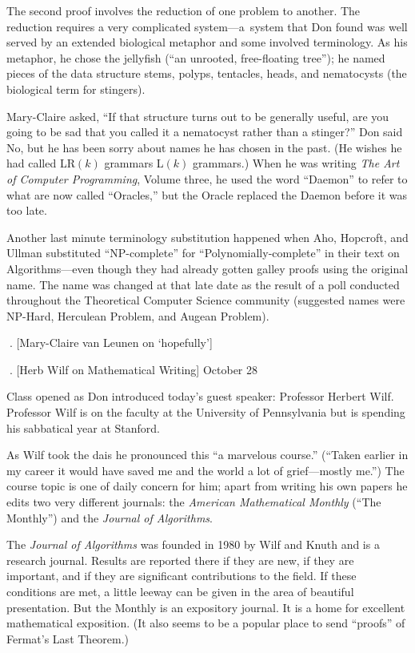 The second proof involves the reduction of one problem to another.  The
reduction requires a very complicated system---a~system that Don found was
well served by an extended biological metaphor and some involved
terminology.  As his metaphor, he chose the jellyfish (``an unrooted,
free-floating tree''); he named pieces of the data structure stems, polyps,
tentacles, heads, and nematocysts (the biological term for stingers).  

Mary-Claire asked, ``If that structure turns out to be generally
useful, are you going to be sad that you called it a nematocyst rather
than a stinger?''  Don said No, but he has been sorry about names he has
chosen in the past. (He wishes he had called LR$(k)$ grammars L$(k)$
grammars.)  When he was writing {\sl The Art of Computer Programming}, Volume
three, he used the word ``Daemon''  to refer to what are
now called ``Oracles,'' but the Oracle replaced the Daemon before
it was too late.

Another last minute terminology substitution happened when Aho, Hopcroft,
and Ullman substituted ``NP-complete'' for ``Polynomially-complete'' in their
text on Algorithms---even though they had already gotten  galley proofs using
the original name.  The name was changed at that late date as the result
of a poll conducted throughout the Theoretical Computer Science community
(suggested names were NP-Hard, Herculean Problem, and Augean Problem).

\vfill\eject
. [Mary-Claire van Leunen on `hopefully']

\vfill\eject
\null\vfill\eject
. [Herb Wilf on Mathematical Writing] \tll October 28

Class opened as Don introduced today's guest speaker: Professor Herbert
Wilf.  Professor Wilf is on the faculty at the University of Pennsylvania
but is spending his sabbatical year at Stanford.  

As Wilf took the dais he pronounced this ``a marvelous course.'' (``Taken
earlier in my career it would have saved me and the world a lot of
grief---mostly me.'')  The course topic is one of daily concern for him;
apart from writing his own papers he edits two very different journals:
the {\sl American Mathematical Monthly\/} (``The {\sc Monthly}'') 
and the {\sl Journal of Algorithms}.

The {\sl Journal of Algorithms\/} was founded in 1980 by Wilf and Knuth and is a
research journal.  Results are reported there if they are new, if they are
important, and if they are significant contributions to the field. If these
conditions are met, a little leeway can be given in the area of beautiful
presentation.  But the {\sc Monthly} is an expository
journal.  It is a home for excellent mathematical exposition.  (It also
seems to be a popular place to send ``proofs'' of Fermat's Last Theorem.)  


